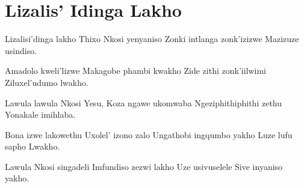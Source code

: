 \starttocol
\chapter{Lizalis' Idinga Lakho}
\nexttocol
\hfill{\it }
\stoptocol
\starttocol
\startlines
{\sc Lizalisi'dinga} lakho
Thixo Nkosi yenyaniso
Zonki intlanga zonk'izizwe
Mazizuze usindiso.  

Amadolo kweli'lizwe
Makagobe phambi kwakho
Zide zithi zonk'iilwimi 
Ziluxel'udumo lwakho. 

Lawula lawula Nkosi Yesu,
Koza ngawe ukomwaba
Ngeziphithiphithi zethu
Yonakale imihlaba.

Bona izwe lakowethu
Uxolel' izono zalo
Ungathobi ingqumbo yakho
Luze lufu sapho Lwakho.

Lawula Nkosi singadeli
Imfundiso zezwi lakho
Uze usivuselele   
Sive inyaniso yakho.

\stoplines
\nexttocol

\stoptocol

